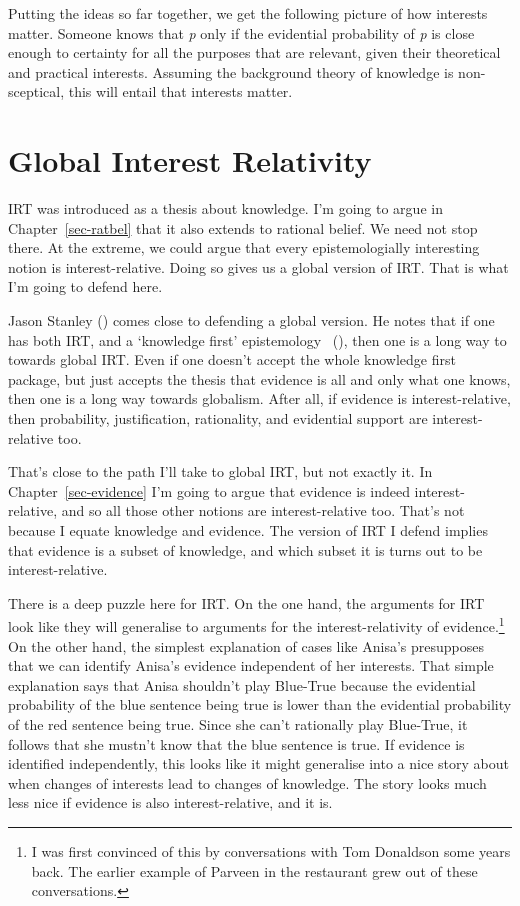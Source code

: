 \documentclass[
  10pt,
  letterpaper,
  twoside]{scrbook}
\begin{document}
Putting the ideas so far together, we get the following picture of how
interests matter. Someone knows that \emph{p} only if the evidential
probability of \emph{p} is close enough to certainty for all the
purposes that are relevant, given their theoretical and practical
interests. Assuming the background theory of knowledge is non-sceptical,
this will entail that interests matter.

\section{Global Interest Relativity}\label{sec-global}

IRT was introduced as a thesis about knowledge. I'm going to argue in
Chapter~\ref{sec-ratbel} that it also extends to rational belief. We
need not stop there. At the extreme, we could argue that every
epistemologially interesting notion is interest-relative. Doing so gives
us a global version of IRT. That is what I'm going to defend here.

Jason Stanley () comes close to
defending a global version. He notes that if one has both IRT, and a
`knowledge first' epistemology
~(), then one is a long
way to towards global IRT. Even if one doesn't accept the whole
knowledge first package, but just accepts the thesis that evidence is
all and only what one knows, then one is a long way towards globalism.
After all, if evidence is interest-relative, then probability,
justification, rationality, and evidential support are interest-relative
too.

That's close to the path I'll take to global IRT, but not exactly it. In
Chapter~\ref{sec-evidence} I'm going to argue that evidence is indeed
interest-relative, and so all those other notions are interest-relative
too. That's not because I equate knowledge and evidence. The version of
IRT I defend implies that evidence is a subset of knowledge, and which
subset it is turns out to be interest-relative.

There is a deep puzzle here for IRT. On the one hand, the arguments for
IRT look like they will generalise to arguments for the
interest-relativity of evidence.\footnote{I was first convinced of this
  by conversations with Tom Donaldson some years back. The earlier
  example of Parveen in the restaurant grew out of these conversations.}
On the other hand, the simplest explanation of cases like Anisa's
presupposes that we can identify Anisa's evidence independent of her
interests. That simple explanation says that Anisa shouldn't play
Blue-True because the evidential probability of the blue sentence being
true is lower than the evidential probability of the red sentence being
true. Since she can't rationally play Blue-True, it follows that she
mustn't know that the blue sentence is true. If evidence is identified
independently, this looks like it might generalise into a nice story
about when changes of interests lead to changes of knowledge. The story
looks much less nice if evidence is also interest-relative, and it is.
\end{document}
